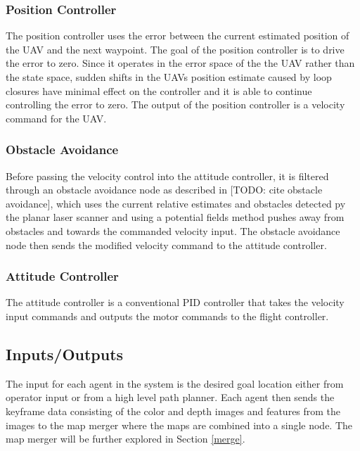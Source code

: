 \documentclass[letterpaper, 10 pt, conference]{ieeeconf}  %
\newcommand{\todo}[1]{{\color{blue}[TODO: #1]}}
\begin{document}
\subsubsection{Position Controller}

The position controller uses the error between the current estimated position of the UAV and the next waypoint. The goal of the position controller is to drive the error to zero. Since it operates in the error space of the the UAV rather than the state space, sudden shifts in the UAVs position estimate caused by loop closures have minimal effect on the controller and it is able to continue controlling the error to zero. The output of the position controller is a velocity command for the UAV.

\subsubsection{Obstacle Avoidance}

Before passing the velocity control into the attitude controller, it is filtered through an obstacle avoidance node as described in \todo{cite obstacle avoidance}, which uses the current relative estimates and obstacles detected py the planar laser scanner and using a potential fields method pushes away from obstacles and towards the commanded velocity input. The obstacle avoidance node then sends the modified velocity command to the attitude controller.

\subsubsection{Attitude Controller}

The attitude controller is a conventional PID controller that takes the velocity input commands and outputs the motor commands to the flight controller.

\subsection{Inputs/Outputs}

The input for each agent in the system is the desired goal location either from operator input or from a high level path planner. Each agent then sends the keyframe data consisting of the color and depth images and features from the images to the map merger where the maps are combined into a single node. The map merger will be further explored in Section \ref{merge}.
\end{document}
